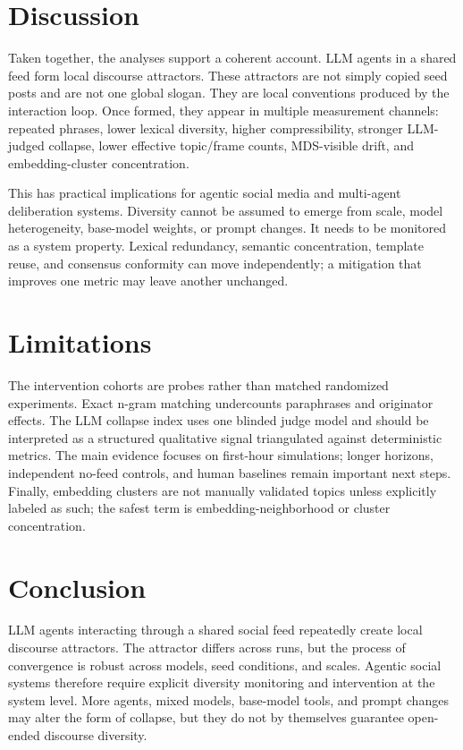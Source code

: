 \documentclass[11pt]{article}
\begin{document}
\section{Discussion}

Taken together, the analyses support a coherent account. LLM agents in a shared feed form local discourse attractors. These attractors are not simply copied seed posts and are not one global slogan. They are local conventions produced by the interaction loop. Once formed, they appear in multiple measurement channels: repeated phrases, lower lexical diversity, higher compressibility, stronger LLM-judged collapse, lower effective topic/frame counts, MDS-visible drift, and embedding-cluster concentration.

This has practical implications for agentic social media and multi-agent deliberation systems. Diversity cannot be assumed to emerge from scale, model heterogeneity, base-model weights, or prompt changes. It needs to be monitored as a system property. Lexical redundancy, semantic concentration, template reuse, and consensus conformity can move independently; a mitigation that improves one metric may leave another unchanged.

\section{Limitations}

The intervention cohorts are probes rather than matched randomized experiments. Exact n-gram matching undercounts paraphrases and originator effects. The LLM collapse index uses one blinded judge model and should be interpreted as a structured qualitative signal triangulated against deterministic metrics. The main evidence focuses on first-hour simulations; longer horizons, independent no-feed controls, and human baselines remain important next steps. Finally, embedding clusters are not manually validated topics unless explicitly labeled as such; the safest term is embedding-neighborhood or cluster concentration.

\section{Conclusion}

LLM agents interacting through a shared social feed repeatedly create local discourse attractors. The attractor differs across runs, but the process of convergence is robust across models, seed conditions, and scales. Agentic social systems therefore require explicit diversity monitoring and intervention at the system level. More agents, mixed models, base-model tools, and prompt changes may alter the form of collapse, but they do not by themselves guarantee open-ended discourse diversity.

\clearpage

\end{document}
